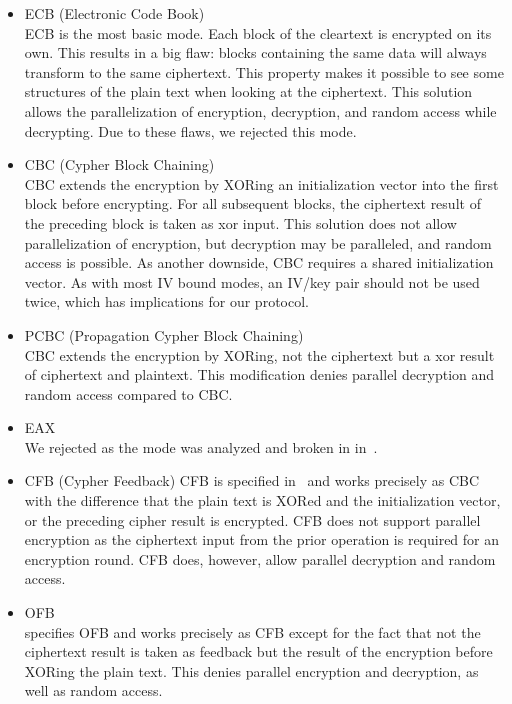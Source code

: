 \begin{itemize}
	\item ECB (Electronic Code Book)\\
	ECB is the most basic mode. Each block of the cleartext is encrypted on its own. This results in a big flaw: blocks containing the same data will always transform to the same ciphertext. This property makes it possible to see some structures of the plain text when looking at the ciphertext. This solution allows the parallelization of encryption, decryption, and random access while decrypting. Due to these flaws, we rejected this mode.
	\item CBC (Cypher Block Chaining)\\  
	CBC extends the encryption by XORing an initialization vector into the first block before encrypting. For all subsequent blocks, the ciphertext result of the preceding block is taken as xor input. This solution does not allow parallelization of encryption, but decryption may be paralleled, and random access is possible. As another downside, CBC requires a shared initialization vector. As with most IV bound modes, an IV/key pair should not be used twice, which has implications for our protocol.
	\item PCBC (Propagation Cypher Block Chaining)\\
	CBC extends the encryption by XORing, not the ciphertext but a xor result of ciphertext and plaintext. This modification denies parallel decryption and random access compared to CBC.
	\item EAX\\      
	We rejected as the mode was analyzed and broken in \citeyear{minematsu2013attacks} in~\cite{minematsu2013attacks}.
	\item CFB (Cypher Feedback)
	CFB is specified in~\cite{dworkin2001recommendation} and works precisely as CBC with the difference that the plain text is XORed and the initialization vector, or the preceding cipher result is encrypted. CFB does not support parallel encryption as the ciphertext input from the prior operation is required for an encryption round. CFB does, however, allow parallel decryption and random access.
	\item OFB\\
	\cite{dworkin2001recommendation} specifies OFB and works precisely as CFB except for the fact that not the ciphertext result is taken as feedback but the result of the encryption before XORing the plain text. This denies parallel encryption and decryption, as well as random access.

\end{itemize}
